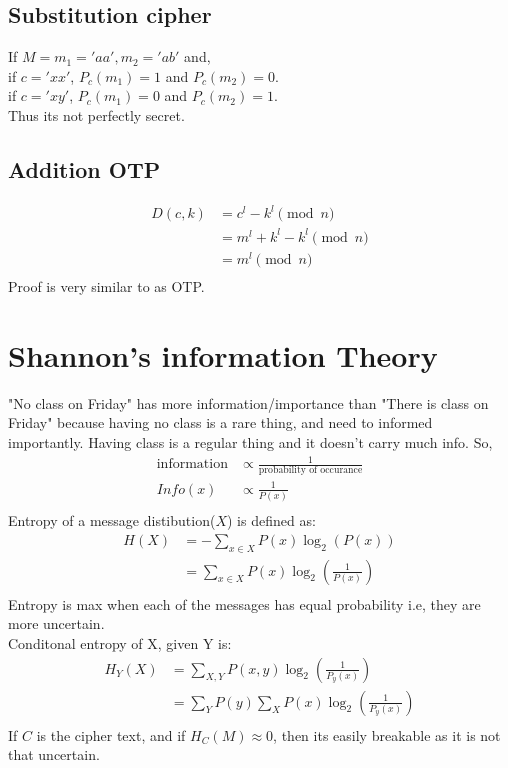 \documentclass[english, 11pt]{article}
\begin{document}
\subsection*{Substitution cipher}
If $M = {m_1='aa',m_2='ab'}$ and,\\
if $c='xx'$, $P_c(m_1) = 1$ and $P_c(m_2) = 0$. \\
if $c='xy'$, $P_c(m_1) = 0$ and $P_c(m_2) = 1$. \\
Thus its not perfectly secret.

\subsection*{Addition OTP}

\begin{align*}
  D(c,k) &= c^l - k^l \pmod{n} \\
  &= m^l + k^l - k^l \pmod{n}\\
  &= m^l \pmod{n}\\
\end{align*}
Proof is very similar to as OTP.

\section*{Shannon's information Theory}
"No class on Friday" has more information/importance than "There is class on Friday" because having no class is a rare thing, and need to informed importantly. Having class is a regular thing and it doesn't carry much info.
So,
\begin{align*}
  \text{information} &\propto \frac{1}{\text{probability of occurance}} \\
  Info(x) &\propto \frac{1}{P(x)} \\
\end{align*}
Entropy of a message distibution($X$) is defined as:
\begin{align*}
  H(X) &= -\sum_{x \in X} P(x) \log_{2}(P(x)) \\
  &= \sum_{x \in X} P(x) \log_{2}(\frac{1}{P(x)}) \\
\end{align*}
Entropy is max when each of the messages has equal probability i.e, they are more uncertain. \\
Conditonal entropy of X, given Y is:
\begin{align*}
  H_Y(X)&= \sum_{X,Y} P(x,y) \log_{2}(\frac{1}{P_y(x)}) \\
  &= \sum_{Y} P(y) \sum_{X} P(x) \log_{2}(\frac{1}{P_y(x)}) \\
\end{align*}
If $C$ is the cipher text, and if $ H_C(M) \approx 0 $, then its easily breakable as it is not that uncertain.
\end{document}
